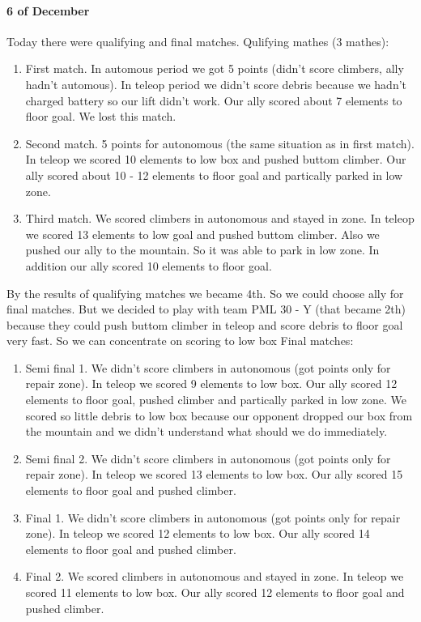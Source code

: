 \paragraph{6 of December} 
Today there were qualifying and final matches.\newline
Qulifying mathes (3 mathes):
\begin{enumerate}
	\item First match. In automous period we got 5 points (didn't score climbers, ally hadn't automous). In teleop period we didn't score debris because we hadn't charged battery so our lift didn't work. Our ally scored about 7 elements to floor goal. We lost this match.
	\item Second match. 5 points for autonomous (the same situation as in first match). In teleop we scored 10 elements to low box and pushed buttom climber. Our ally scored about 10 - 12 elements to floor goal and partically parked in low zone.
	\item Third match. We scored climbers in autonomous and stayed in zone. In teleop we scored 13 elements to low goal and pushed buttom climber. Also we pushed our ally to the mountain. So it was able to park in low zone. In addition our ally scored 10 elements to floor goal.
\end{enumerate}
By the results of qualifying matches we became 4th. So we could choose ally for final matches. But we decided to play with team PML 30 - Y (that became 2th) because they could push buttom climber in teleop and score debris to floor goal very fast. So we can concentrate on scoring to low box\newline
Final matches:
\begin{enumerate}
	\item Semi final 1. We didn't score climbers in autonomous (got points only for repair zone). In teleop we scored 9 elements to low box. Our ally scored 12 elements to floor goal, pushed climber and partically parked in low zone. We scored so little debris to low box because our opponent dropped our box from the mountain and we didn't understand what should we do immediately.
	
	\item Semi final 2. We didn't score climbers in autonomous (got points only for repair zone). In teleop we scored 13 elements to low box. Our ally scored 15 elements to floor goal and pushed climber.
	
	\item Final 1. We didn't score climbers in autonomous (got points only for repair zone). In teleop we scored 12 elements to low box. Our ally scored 14 elements to floor goal and pushed climber.
	
	\item Final 2. We scored climbers in autonomous and stayed in zone. In teleop we scored 11 elements to low box. Our ally scored 12 elements to floor goal and pushed climber.
\end{enumerate} 
